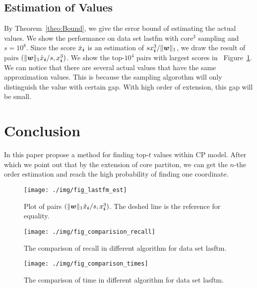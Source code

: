 \documentclass[letterpaper]{article}
\newcommand{\V}[1]{{\boldsymbol{{\MakeLowercase{#1}}}}}
\newcommand{\norm}[2]{\|#1\|_{#2}}
\newcommand{\Fig}[1]   {Figure~\ref{fig:#1}}
\newcommand{\Theo}[1] {Theorem~\ref{theo:#1}}
\begin{document}
\subsection{Estimation of Values}
By \Theo{Bound}, we give the error bound of estimating the actual values.
We show the performance on data set lastfm with core$^3$ sampling and $s=10^8$.
Since the score $\hat{x}_{\V{i}}$ is an estimation of $sx^3_{\V{i}}/\norm{\V{w}}{1}$,
we draw the result of pairs $(\norm{\V{w}}{1}\hat{x}_{\V{i}}/s,x^3_{\V{i}})$.
We show the top-$10^4$ pairs with largest scores in ~\Fig{Est}.
We can notice that there are several actual values that have the same approximation values.
This is because the sampling algorothm will only distinguish the value with certain gap.
With high order of extension, this gap will be small. 
\section{Conclusion}
In this paper propose a method for finding top-$t$ values within CP model.
After which we point out that by the extension of core partiton, 
we can get the $n$-the order estimation and reach the high probability of finding one coordinate.
\begin{figure}[t]
  \centering
  \texttt{[image: ./img/fig\_lastfm\_est]}\\
  \caption{Plot of pairs $(\norm{\V{w}}{1}\hat{x}_{\V{i}}/s,x^3_{\V{i}})$.
          The deshed line is the reference for equality.}
  \label{fig:Est}
\end{figure}

\begin{figure}[t]
  \centering
  \texttt{[image: ./img/fig\_comparision\_recall]}\\
  \caption{The comparison of recall in different algorithm for data set lasftm.}
  \label{fig:Comparison_recall}
\end{figure}

\begin{figure}[H]
    \centering
    \texttt{[image: ./img/fig\_comparison\_times]}\\
    \caption{The comparison of time in different algorithm for data set lasftm.}
\label{fig:Comparison_time}
\end{figure}




\end{document}

